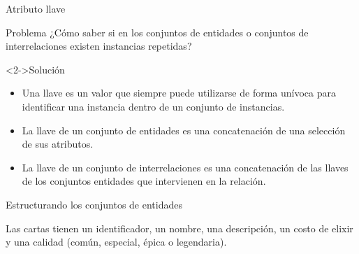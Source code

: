 \begin{frame}{Atributo llave}
    \begin{block}{Problema}
        ¿C\'omo saber si en los conjuntos de entidades o conjuntos de interrelaciones existen
        instancias repetidas?
    \end{block}

    \begin{block}<2->{Soluci\'on}
        \begin{itemize}
            \item<2-> Una llave es un valor que siempre puede utilizarse de forma
            un\'ivoca para identificar una instancia dentro de un conjunto de instancias.
            \item<3-> La llave de un conjunto de entidades es una concatenaci\'on de una selecci\'on de sus atributos.
            \item<4-> La llave
            de un conjunto de interrelaciones es una concatenaci\'on de las llaves de
            los conjuntos entidades que intervienen en la relaci\'on.
        \end{itemize}
       
    \end{block}
\end{frame}

\begin{frame}{Estructurando los conjuntos de entidades}
    \begin{block}{}
        Las {cartas} tienen un {\color<2->{attr}identificador}, un {nombre}, una {descripci\'on}, 
        un {costo de elixir}  y una {calidad} (común,
        especial, épica o legendaria).
    \end{block}
    \vspace{5mm}

\end{frame}

